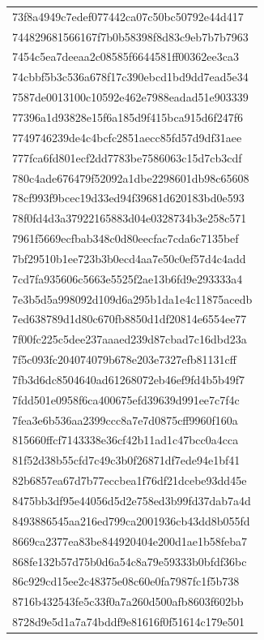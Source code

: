 \begin{tabular}{l}
73f8a4949c7edef077442ca07c50bc50792e44d417 \\
744829681566167f7b0b58398f8d83c9eb7b7b7963 \\
7454c5ea7deeaa2c08585f6644581ff00362ee3ca3 \\
74cbbf5b3c536a678f17c390ebcd1bd9dd7ead5e34 \\
7587de0013100c10592e462e7988eadad51e903339 \\
77396a1d93828e15f6a185d9f415bca915d6f247f6 \\
7749746239de4c4bcfc2851aecc85fd57d9df31aee \\
777fca6fd801ecf2dd7783be7586063c15d7cb3cdf \\
780c4ade676479f52092a1dbe2298601db98c65608 \\
78cf993f9bcec19d33ed94f39681d620183bd0e593 \\
78f0fd4d3a37922165883d04e0328734b3e258c571 \\
7961f5669ecfbab348c0d80eecfac7cda6c7135bef \\
7bf29510b1ee723b3b0ecd4aa7e50c0ef57d4c4add \\
7cd7fa935606c5663e5525f2ae13b6fd9e293333a4 \\
7e3b5d5a998092d109d6a295b1da1e4c11875acedb \\
7ed638789d1d80c670fb8850d1df20814e6554ee77 \\
7f00fc225c5dee237aaaed239d87cbad7c16dbd23a \\
7f5c093fc204074079b678e203e7327efb81131cff \\
7fb3d6dc8504640ad61268072eb46ef9fd4b5b49f7 \\
7fdd501e0958f6ca400675efd39639d991ee7c7f4c \\
7fea3e6b536aa2399ccc8a7e7d0875cff9960f160a \\
815660ffcf7143338e36cf42b11ad1c47bcc0a4cca \\
81f52d38b55cfd7c49c3b0f26871df7ede94e1bf41 \\
82b6857ea67d7b77eccbea1f76df21dcebe93dd45e \\
8475bb3df95e44056d5d2e758ed3b99fd37dab7a4d \\
8493886545aa216ed799ca2001936cb43dd8b055fd \\
8669ca2377ea83be844920404e200d1ae1b58feba7 \\
868fe132b57d75b0d6a54c8a79e59333b0bfdf36bc \\
86c929cd15ee2c48375e08c60e0fa7987fc1f5b738 \\
8716b432543fe5c33f0a7a260d500afb8603f602bb \\
8728d9e5d1a7a74bddf9e81616f0f51614c179e501 \\

\end{tabular}

